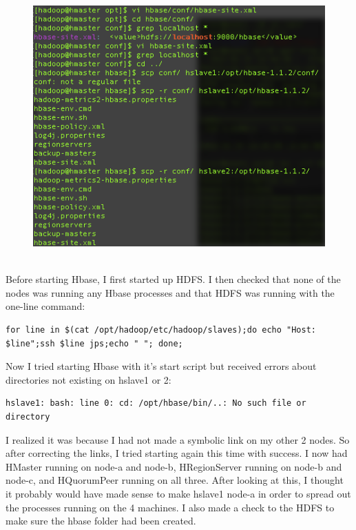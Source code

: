 \documentclass[10pt]{article}
\begin{document}
\begin{figure}[!h]
\includegraphics[scale=0.37]{copy_configs.png}
\centering
\end{figure}\\
\indent Before starting Hbase, I first started up HDFS. I then checked that none of the nodes was running any Hbase processes and that HDFS was running with the one-line command:
\begin{verbatim}
for line in $(cat /opt/hadoop/etc/hadoop/slaves);do echo "Host: $line";ssh $line jps;echo " "; done;
\end{verbatim} 
Now I tried starting Hbase with it's start script but received errors about directories not existing on hslave1 or 2:
\begin{verbatim}
hslave1: bash: line 0: cd: /opt/hbase/bin/..: No such file or directory
\end{verbatim}
I realized it was because I had not made a symbolic link on my other 2 nodes. So after correcting the links, I tried starting again this time with success. I now had HMaster running on node-a and node-b, HRegionServer running on node-b and node-c, and HQuorumPeer running on all three. After looking at this, I thought it probably would have made sense to make hslave1 node-a in order to spread out the processes running on the 4 machines. I also made a check to the HDFS to make sure the hbase folder had been created.
\end{document}
